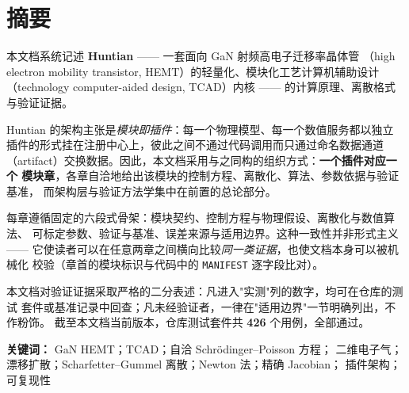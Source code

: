 
\chapter*{摘要}

本文档系统记述 \textbf{Huntian} —— 一套面向 GaN 射频高电子迁移率晶体管
（high electron mobility transistor, HEMT）的轻量化、模块化工艺计算机辅助设计
（technology computer-aided design, TCAD）内核 —— 的计算原理、离散格式与验证证据。

Huntian 的架构主张是\emph{模块即插件}：每一个物理模型、每一个数值服务都以独立
插件的形式挂在注册中心上，彼此之间不通过代码调用而只通过命名数据通道
（artifact）交换数据。因此，本文档采用与之同构的组织方式：\textbf{一个插件对应一个
模块章}，各章自洽地给出该模块的控制方程、离散化、算法、参数依据与验证基准，
而架构层与验证方法学集中在前置的总论部分。

每章遵循固定的六段式骨架：模块契约、控制方程与物理假设、离散化与数值算法、
可标定参数、验证与基准、误差来源与适用边界。这种一致性并非形式主义 ——
它使读者可以在任意两章之间横向比较\emph{同一类证据}，也使文档本身可以被机械化
校验（章首的模块标识与代码中的 \texttt{MANIFEST} 逐字段比对）。

本文档对验证证据采取严格的二分表述：凡进入"实测"列的数字，均可在仓库的测试
套件或基准记录中回查；凡未经验证者，一律在"适用边界"一节明确列出，不作粉饰。
截至本文档当前版本，仓库测试套件共 \textbf{426} 个用例，全部通过。

\vspace{1em}
\noindent\textbf{关键词：} GaN HEMT；TCAD；自洽 Schrödinger--Poisson 方程；
二维电子气；漂移扩散；Scharfetter--Gummel 离散；Newton 法；精确 Jacobian；
插件架构；可复现性

\cleardoublepage

